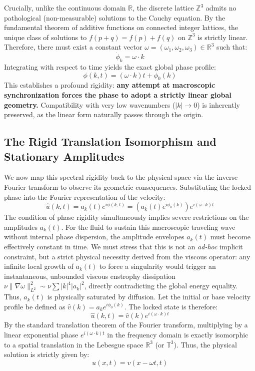 \documentclass[12pt,a4paper]{article}
\theoremstyle{plain}
\theoremstyle{definition}
\theoremstyle{remark}
\begin{document}
Crucially, unlike the continuous domain $\mathbb{R}$, the discrete lattice $\mathbb{Z}^3$ admits no pathological (non-measurable) solutions to the Cauchy equation. By the fundamental theorem of additive functions on connected integer lattices, the unique class of solutions to $f(p+q) = f(p) + f(q)$ on $\mathbb{Z}^3$ is strictly linear. Therefore, there must exist a constant vector $\omega = (\omega_1, \omega_2, \omega_3) \in \mathbb{R}^3$ such that:
\begin{equation}
    \dot{\phi}_k = \omega \cdot k
\end{equation}
Integrating with respect to time yields the exact global phase profile:
\begin{equation}
    \phi(k, t) = (\omega \cdot k) t + \phi_0(k)
\end{equation}
This establishes a profound rigidity: \textbf{any attempt at macroscopic synchronization forces the phase to adopt a strictly linear global geometry.} Compatibility with very low wavenumbers ($|k| \to 0$) is inherently preserved, as the linear form naturally passes through the origin.

\subsection{The Rigid Translation Isomorphism and Stationary Amplitudes}
We now map this spectral rigidity back to the physical space via the inverse Fourier transform to observe its geometric consequences. Substituting the locked phase into the Fourier representation of the velocity:
\begin{equation}
    \hat{u}(k, t) = a_k(t) e^{i \phi(k, t)} = \left( a_k(t) e^{i \phi_0(k)} \right) e^{i (\omega \cdot k) t}
\end{equation}
The condition of phase rigidity simultaneously implies severe restrictions on the amplitudes $a_k(t)$. For the fluid to sustain this macroscopic traveling wave without internal phase dispersion, the amplitude envelopes $a_k(t)$ must become effectively constant in time. We must stress that this is not an \textit{ad-hoc} implicit constraint, but a strict physical necessity derived from the viscous operator: any infinite local growth of $a_k(t)$ to force a singularity would trigger an instantaneous, unbounded viscous enstrophy dissipation $\nu \|\nabla \omega\|_{L^2}^2 \sim \nu \sum |k|^4 |a_k|^2$, directly contradicting the global energy equality. Thus, $a_k(t)$ is physically saturated by diffusion. Let the initial or base velocity profile be defined as $\hat{v}(k) = a_k e^{i \phi_0(k)}$. The locked state is therefore:
\begin{equation}
    \hat{u}(k, t) = \hat{v}(k) e^{i (\omega \cdot k) t}
\end{equation}
By the standard translation theorem of the Fourier transform, multiplying by a linear exponential phase $e^{i (\omega \cdot k) t}$ in the frequency domain is exactly isomorphic to a spatial translation in the Lebesgue space $\mathbb{R}^3$ (or $\mathbb{T}^3$). Thus, the physical solution is strictly given by:
\begin{equation}
    u(x, t) = v(x - \omega t, t)
\end{equation}
\end{document}
